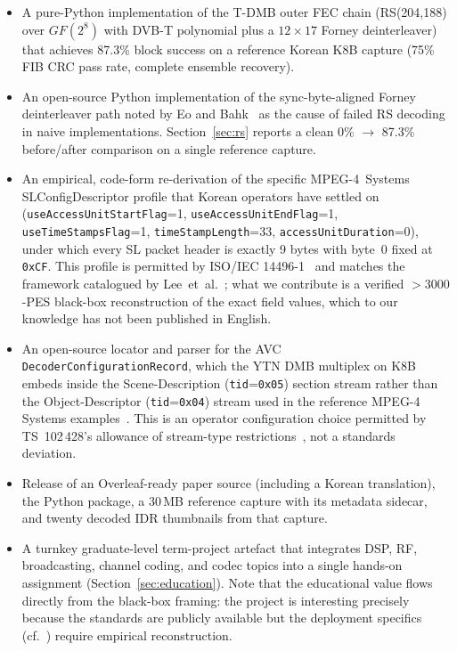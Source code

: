 \documentclass[11pt,a4paper]{article}
\begin{document}
\begin{itemize}[leftmargin=*,nosep]
\item A pure-Python implementation of the T-DMB outer FEC chain
      (RS(204,188) over $GF(2^8)$ with DVB-T polynomial plus a
      $12\times17$ Forney deinterleaver) that achieves 87.3\% block
      success on a reference Korean K8B capture (75\% FIB CRC pass
      rate, complete ensemble recovery).
\item An open-source Python implementation of the sync-byte-aligned
      Forney deinterleaver path noted by Eo and
      Bahk~\cite{eo2024tdmb} as the cause of failed RS decoding in
      naive implementations.  Section~\ref{sec:rs} reports a clean
      0\% $\to$ 87.3\% before/after comparison on a single reference
      capture.
\item An empirical, code-form re-derivation of the specific
      MPEG-4~Systems SLConfigDescriptor profile that Korean
      operators have settled on
      (\texttt{useAccessUnitStartFlag}=1, \texttt{useAccessUnitEndFlag}=1,
      \texttt{useTimeStampsFlag}=1,
      \texttt{timeStampLength}=33,
      \texttt{accessUnitDuration}=0), under which every SL packet
      header is exactly 9 bytes with byte~0 fixed at \texttt{0xCF}.
      This profile is permitted by ISO/IEC
      14496-1~\cite{iso14496-1} and matches the framework
      catalogued by Lee~et~al.~\cite{lee2004m4smux}; what we
      contribute is a verified ${>}3000$-PES black-box
      reconstruction of the exact field values, which to our
      knowledge has not been published in English.
\item An open-source locator and parser for the AVC
      \texttt{DecoderConfigurationRecord}, which the YTN DMB
      multiplex on K8B embeds inside the Scene-Description
      (\texttt{tid}=\texttt{0x05}) section stream rather than the
      Object-Descriptor (\texttt{tid}=\texttt{0x04}) stream used
      in the reference MPEG-4 Systems
      examples~\cite{iso14496-1}.  This is an operator
      configuration choice permitted by TS~102\,428's allowance
      of stream-type restrictions~\cite{etsi102428}, not a
      standards deviation.
\item Release of an Overleaf-ready paper source (including a
      Korean translation), the Python package, a 30\,MB reference
      capture with its metadata sidecar, and twenty decoded IDR
      thumbnails from that capture.
\item A turnkey graduate-level term-project artefact that
      integrates DSP, RF, broadcasting, channel coding, and codec
      topics into a single hands-on assignment
      (Section~\ref{sec:education}).  Note that the educational
      value flows directly from the black-box framing: the project
      is interesting precisely because the standards are publicly
      available but the deployment specifics
      (cf.~\cite{lee2004m4smux}) require empirical reconstruction.
\end{itemize}
\end{document}
